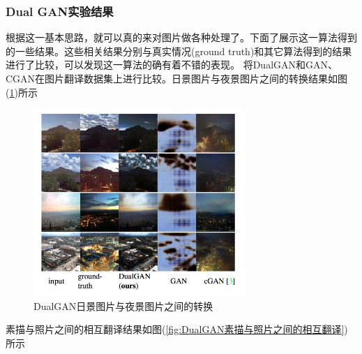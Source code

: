         \subsubsection{Dual GAN实验结果}
            \par
            根据这一基本思路，就可以真的来对图片做各种处理了。下面了展示这一算法得到的一些结果。这些相关结果分别与真实情况(ground truth)和其它算法得到的结果进行了比较，可以发现这一算法的确有着不错的表现。
            将DualGAN和GAN、CGAN在图片翻译数据集上进行比较。日景图片与夜景图片之间的转换结果如图(\ref{fig:DualGAN日景图片与夜景图片之间的转换})所示
                \begin{figure}[H]
                \centering
                \includegraphics[width=8cm]{images/DualGAN.jpg}
                \caption{DualGAN日景图片与夜景图片之间的转换}
                \label{fig:DualGAN日景图片与夜景图片之间的转换}
                \end{figure}
            素描与照片之间的相互翻译结果如图(\ref{fig:DualGAN素描与照片之间的相互翻译})所示
